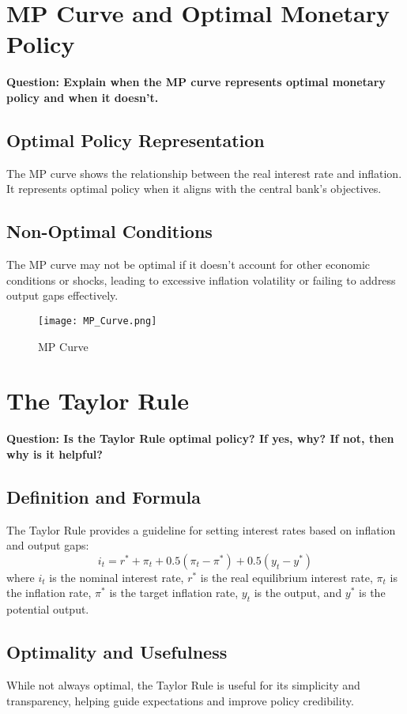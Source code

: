 \documentclass{article}
\begin{document}
\section{MP Curve and Optimal Monetary Policy}
\textbf{Question: Explain when the MP curve represents optimal monetary policy and when it doesn’t.}

\subsection{Optimal Policy Representation}
The MP curve shows the relationship between the real interest rate and inflation. It represents optimal policy when it aligns with the central bank's objectives.

\subsection{Non-Optimal Conditions}
The MP curve may not be optimal if it doesn't account for other economic conditions or shocks, leading to excessive inflation volatility or failing to address output gaps effectively.

\begin{figure}[h]
\centering
\texttt{[image: MP\_Curve.png]}
\caption{MP Curve}
\end{figure}

\section{The Taylor Rule}
\textbf{Question: Is the Taylor Rule optimal policy? If yes, why? If not, then why is it helpful?}

\subsection{Definition and Formula}
The Taylor Rule provides a guideline for setting interest rates based on inflation and output gaps:
\[
i_t = r^* + \pi_t + 0.5(\pi_t - \pi^*) + 0.5(y_t - y^*)
\]
where $i_t$ is the nominal interest rate, $r^*$ is the real equilibrium interest rate, $\pi_t$ is the inflation rate, $\pi^*$ is the target inflation rate, $y_t$ is the output, and $y^*$ is the potential output.

\subsection{Optimality and Usefulness}
While not always optimal, the Taylor Rule is useful for its simplicity and transparency, helping guide expectations and improve policy credibility.
\end{document}
